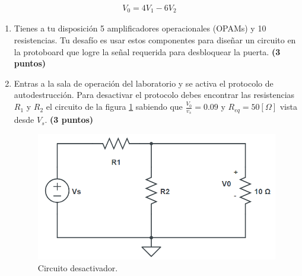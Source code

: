 \documentclass[
	spanish, %
	letterpaper, oneside
]{article}
\begin{document}
\begin{enumerate}
    \begin{align*}
    V_{0} = 4V_{1} - 6V_{2}
    \end{align*}
    \begin{enumerate}
    \item Tienes a tu disposición 5 amplificadores operacionales (OPAMs) y 10 resistencias. Tu desafío es usar estos componentes para diseñar un circuito en la protoboard que logre la señal requerida para desbloquear la puerta. \textbf{(3 puntos)} 
    \item Entras a la sala de operación del laboratorio y se activa el protocolo de autodestrucción. Para desactivar el protocolo debes encontrar las resistencias $R_1$ y $R_2$ el circuito de la figura \ref{fig:p3} sabiendo que $\frac{V_0}{v_s} = 0.09$ y $R_{eq} = 50[\Omega]$ vista desde $V_s$. \textbf{(3 puntos)}
    \begin{figure}
    \centering
    \includegraphics[width=0.5\linewidth]{img/EEEE.png}
    \caption{Circuito desactivador.}
    \label{fig:p3}
    \end{figure}
    
\end{enumerate}
\end{enumerate}
\end{document}
